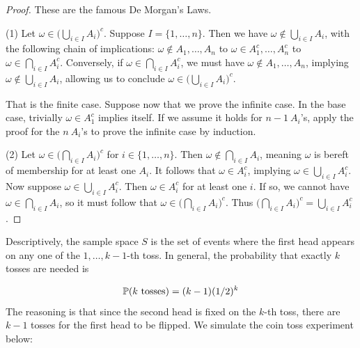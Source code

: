 \documentclass[a4paper]{article}
\begin{document}
\begin{proof}[Proof]
These are the famous De Morgan's Laws.
\vspace{12pt}
\par (1) Let \(\omega \in \big(\bigcup_{i \in  I} A_{i} \big)^{c} \). Suppose \(I = \{1, \dots, n \} \). Then we have \(\omega \not\in \bigcup_{i \in  I} A_{i}\), with the following chain of implications: \(\omega \not\in A_{1}, \dots, A_{n}\) to \(\omega \in A_{1}^{c}, \dots, A_{n}^{c}\) to \(\omega \in \bigcap_{i \in  I} A_{i}^{c}\). Conversely, if \(\omega \in \bigcap_{i \in  I} A_{i}^{c}\), we must have \(\omega \not\in A_{1},\dots, A_{n}\), implying \(\omega \not\in \bigcup_{i \in  I} A_{i}\), allowing us to conclude \(\omega \in \big(\bigcup_{i \in  I} A_{i} \big)^{c} \).

That is the finite case. Suppose now that we prove the infinite case. In the base case, trivially \(\omega \in A_{1}^{c}\) implies itself. If we assume it holds for \(n-1 \  A_{i}\)'s, apply the proof for the \(n \  A_{i}\)'s to prove the infinite case by induction.
\vspace{12pt}
\par (2) Let \(\omega \in \big(\bigcap_{i \in  I} A_{i} \big)^{c}\) for \(i \in \{1, \dots, n \} \). Then \(\omega \not\in \bigcap_{i \in  I} A_{i}\), meaning \(\omega\) is bereft of membership for at least one \(A_{i}\). It follows that \(\omega \in A_{i}^{c}\), implying \(\omega \in \bigcup_{i \in  I} A_{i}^{c}\). Now suppose \(\omega \in \bigcup_{i \in  I} A_{i}^{c}\). Then \(\omega \in A_{i}^{c}\) for at least one \(i\). If so, we cannot have \(\omega \in \bigcap_{i \in  I} A_{i}\), so it must follow that \(\omega \in \big(\bigcap_{i \in  I} A_{i} \big)^{c}\). Thus \( \big(\bigcap_{i \in  I} A_{i} \big)^{c} = \bigcup_{i \in  I} A_{i}^{c}\).
\end{proof}


Descriptively, the sample space \(S\) is the set of events where the first head appears on any one of the \(1,\dots, k-1\)-th toss. In general, the probability that exactly \(k\) tosses are needed is

\[
	\mathbb{P}(k \text{ tosses}) = (k-1)(1/2)^{k}
\]
The reasoning is that since the second head is fixed on the \(k\)-th toss, there are \(k-1\) tosses for the first head to be flipped. We simulate the coin toss experiment below:
\end{document}
